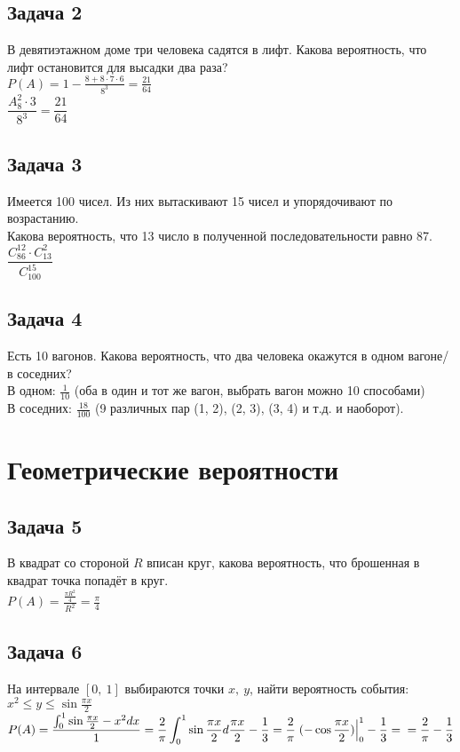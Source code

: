 \documentclass[12pt, a4paper]{article}
\begin{document}
    \subsection*{Задача 2}
    В девятиэтажном доме три человека садятся в лифт. Какова вероятность, что лифт остановится для высадки два раза?\\
    $P(A) = 1 - \frac{8 + 8\cdot 7\cdot 6}{8^3} = \frac{21}{64}$\\
    $\dfrac{A^2_8\cdot 3}{8^3} = \dfrac{21}{64}$
    \subsection*{Задача 3}
    Имеется 100 чисел. Из них вытаскивают 15 чисел и упорядочивают по возрастанию.\\
    Какова вероятность, что 13 число в полученной последовательности равно 87.\\
    $\dfrac{C_{86}^{12}\cdot C^2_{13}}{C_{100}^{15}}$
    \subsection*{Задача 4}
    Есть 10 вагонов. Какова вероятность, что два человека окажутся в одном вагоне/ в соседних?\\
    В одном: $\frac{1}{10}$ (оба в один и тот же вагон, выбрать вагон можно 10 способами)\\
    В соседних: $\frac{18}{100}$ (9 различных пар (1, 2), (2, 3), (3, 4) и т.д. и наоборот).
    \section*{Геометрические вероятности}
    \subsection*{Задача 5}
    В квадрат со стороной $R$ вписан круг, какова вероятность, что брошенная в квадрат точка попадёт в круг.\\
    $P(A) = \frac{\frac{\pi R^2}{4}}{R^2} = \frac{\pi}{4}$
    \subsection*{Задача 6}
    На интервале $[0,\ 1]$ выбираются точки $x,\ y$, найти вероятность события:\\
    $x^2\leq y\leq\sin \frac{\pi x}{2}$\\
    $P(A) = \displaystyle \frac{\int_0^1 \sin\frac{\pi x}{2} - x^2 dx}{1} = \frac{2}{\pi}\int_0^1 \sin\frac{\pi x}{2} d\frac{\pi x}{2} - \frac{1}{3} = \frac{2}{\pi}\left.(-\cos \frac{\pi x}{2})\right|_0^1 - \frac{1}{3} = \\
    = \frac{2}{\pi} - \frac{1}{3}$
\end{document}
